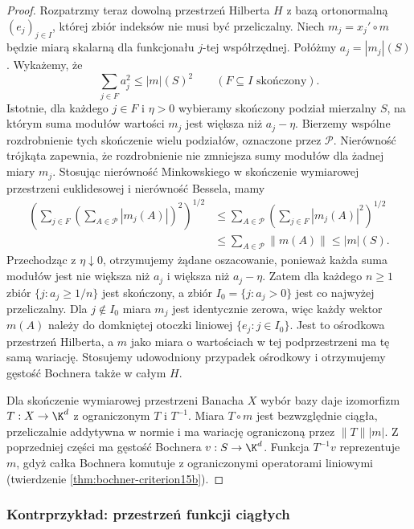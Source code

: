 \begin{proof}
Rozpatrzmy teraz dowolną przestrzeń Hilberta $H$
z bazą ortonormalną $(e_j)_{j\in I}$, której zbiór
indeksów nie musi być przeliczalny.
Niech $m_j=x_j'\circ m$ będzie miarą skalarną
dla funkcjonału $j$-tej współrzędnej.
Połóżmy $a_j=|m_j|(S)$. Wykażemy, że
\[
 \sum_{j\in F}a_j^2\le |m|(S)^2
 \qquad(F\subseteq I\text{ skończony}).
\]
Istotnie, dla każdego $j\in F$ i $\eta>0$ wybieramy
skończony podział mierzalny $S$, na którym suma
modułów wartości $m_j$ jest większa niż $a_j-\eta$.
Bierzemy wspólne rozdrobnienie tych skończenie wielu
podziałów, oznaczone przez $\mathcal P$.
Nierówność trójkąta zapewnia, że rozdrobnienie
nie zmniejsza sumy modułów dla żadnej miary $m_j$.
Stosując nierówność Minkowskiego w skończenie wymiarowej
przestrzeni euklidesowej i nierówność Bessela, mamy
\[
 \begin{aligned}
 \left(\sum_{j\in F}\left(\sum_{A\in\mathcal P}
 |m_j(A)|\right)^2\right)^{1/2}
 &\le\sum_{A\in\mathcal P}
       \left(\sum_{j\in F}|m_j(A)|^2\right)^{1/2}\\
 &\le\sum_{A\in\mathcal P}\|m(A)\|\le |m|(S).
 \end{aligned}
\]
Przechodząc z $\eta\downarrow0$, otrzymujemy
żądane oszacowanie, ponieważ każda suma modułów
jest nie większa niż $a_j$ i większa niż $a_j-\eta$.
Zatem dla każdego $n\ge1$ zbiór $\{j:a_j\ge1/n\}$
jest skończony, a zbiór $I_0=\{j:a_j>0\}$ jest
co najwyżej przeliczalny. Dla $j\notin I_0$ miara
$m_j$ jest identycznie zerowa, więc każdy wektor
$m(A)$ należy do domkniętej otoczki liniowej
$\{e_j:j\in I_0\}$. Jest to ośrodkowa przestrzeń
Hilberta, a $m$ jako miara o wartościach w tej
podprzestrzeni ma tę samą wariację. Stosujemy
udowodniony przypadek ośrodkowy i otrzymujemy
gęstość Bochnera także w całym $H$.

Dla skończenie wymiarowej przestrzeni Banacha $X$
wybór bazy daje izomorfizm $T:X\to\K^d$ z ograniczonym
$T$ i $T^{-1}$. Miara $T\circ m$ jest bezwzględnie
ciągła, przeliczalnie addytywna w normie i ma wariację
ograniczoną przez $\|T\||m|$. Z poprzedniej części
ma gęstość Bochnera $v:S\to\K^d$. Funkcja $T^{-1}v$
reprezentuje $m$, gdyż całka Bochnera komutuje
z ograniczonymi operatorami liniowymi (twierdzenie
\ref{thm:bochner-criterion15b}).
\end{proof}

\subsubsection{Kontrprzykład: przestrzeń funkcji ciągłych}

